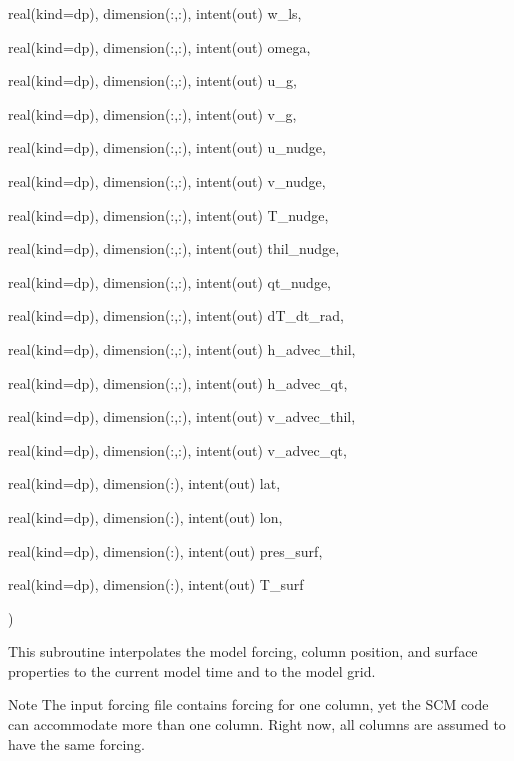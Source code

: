 {\begin{DoxyParamCaption}
\item[{real(kind=dp), dimension(\+:,\+:), intent(out)}]{w\+\_\+ls, }
\item[{real(kind=dp), dimension(\+:,\+:), intent(out)}]{omega, }
\item[{real(kind=dp), dimension(\+:,\+:), intent(out)}]{u\+\_\+g, }
\item[{real(kind=dp), dimension(\+:,\+:), intent(out)}]{v\+\_\+g, }
\item[{real(kind=dp), dimension(\+:,\+:), intent(out)}]{u\+\_\+nudge, }
\item[{real(kind=dp), dimension(\+:,\+:), intent(out)}]{v\+\_\+nudge, }
\item[{real(kind=dp), dimension(\+:,\+:), intent(out)}]{T\+\_\+nudge, }
\item[{real(kind=dp), dimension(\+:,\+:), intent(out)}]{thil\+\_\+nudge, }
\item[{real(kind=dp), dimension(\+:,\+:), intent(out)}]{qt\+\_\+nudge, }
\item[{real(kind=dp), dimension(\+:,\+:), intent(out)}]{d\+T\+\_\+dt\+\_\+rad, }
\item[{real(kind=dp), dimension(\+:,\+:), intent(out)}]{h\+\_\+advec\+\_\+thil, }
\item[{real(kind=dp), dimension(\+:,\+:), intent(out)}]{h\+\_\+advec\+\_\+qt, }
\item[{real(kind=dp), dimension(\+:,\+:), intent(out)}]{v\+\_\+advec\+\_\+thil, }
\item[{real(kind=dp), dimension(\+:,\+:), intent(out)}]{v\+\_\+advec\+\_\+qt, }
\item[{real(kind=dp), dimension(\+:), intent(out)}]{lat, }
\item[{real(kind=dp), dimension(\+:), intent(out)}]{lon, }
\item[{real(kind=dp), dimension(\+:), intent(out)}]{pres\+\_\+surf, }
\item[{real(kind=dp), dimension(\+:), intent(out)}]{T\+\_\+surf}
\end{DoxyParamCaption}
)}\hypertarget{group__forcing_gaee4d8a92d081863df4499f2e1dce82bd}{}\label{group__forcing_gaee4d8a92d081863df4499f2e1dce82bd}


This subroutine interpolates the model forcing, column position, and surface properties to the current model time and to the model grid. 

\begin{DoxyNote}{Note}
The input forcing file contains forcing for one column, yet the S\+CM code can accommodate more than one column. Right now, all columns are assumed to have the same forcing.
\end{DoxyNote}

